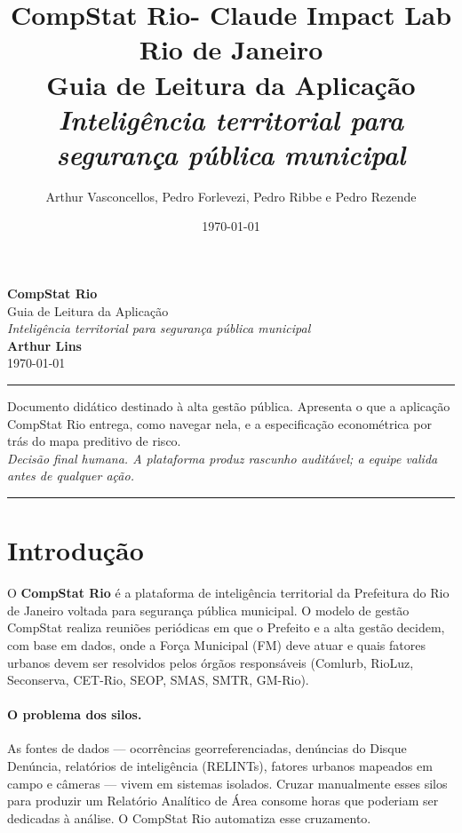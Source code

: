 \documentclass[11pt,a4paper]{article}
\title{%
  \textbf{CompStat Rio- Claude Impact Lab Rio de Janeiro} \\[0.4em]
  \large{Guia de Leitura da Aplicação} \\[0.3em]
  \normalsize\itshape Inteligência territorial para segurança pública municipal
}
\author{Arthur Vasconcellos, Pedro Forlevezi, Pedro Ribbe e Pedro Rezende}
\date{\today}
\begin{document}
\begin{titlepage}
  \centering
  \vspace*{2cm}
  {\Huge \textbf{CompStat Rio}} \\[0.6cm]
  {\Large Guia de Leitura da Aplicação} \\[0.4cm]
  {\large\itshape Inteligência territorial para segurança pública municipal} \\[2cm]

  {\large \textbf{Arthur Lins}} \\[0.3cm]
  {\large \today}
  \vfill
  \noindent\rule{\linewidth}{0.4pt}
  \begin{flushleft}
    \small
    Documento didático destinado à alta gestão pública. Apresenta o que a
    aplicação CompStat Rio entrega, como navegar nela, e a especificação
    econométrica por trás do mapa preditivo de risco. \\[0.3em]
    \emph{Decisão final humana. A plataforma produz rascunho auditável; a
    equipe valida antes de qualquer ação.}
  \end{flushleft}
  \noindent\rule{\linewidth}{0.4pt}
\end{titlepage}

\tableofcontents
\newpage

\section{Introdução}
\label{sec:introducao}

O \textbf{CompStat Rio} é a plataforma de inteligência territorial da
Prefeitura do Rio de Janeiro voltada para segurança pública municipal.
O modelo de gestão CompStat realiza reuniões periódicas em que o Prefeito
e a alta gestão decidem, com base em dados, onde a Força Municipal (FM)
deve atuar e quais fatores urbanos devem ser resolvidos pelos órgãos
responsáveis (Comlurb, RioLuz, Seconserva, CET-Rio, SEOP, SMAS, SMTR,
GM-Rio).

\paragraph{O problema dos silos.} As fontes de dados — ocorrências
georreferenciadas, denúncias do Disque Denúncia, relatórios de
inteligência (RELINTs), fatores urbanos mapeados em campo e câmeras —
vivem em sistemas isolados. Cruzar manualmente esses silos para produzir
um Relatório Analítico de Área consome horas que poderiam ser dedicadas à
análise. O CompStat Rio automatiza esse cruzamento.
\end{document}
